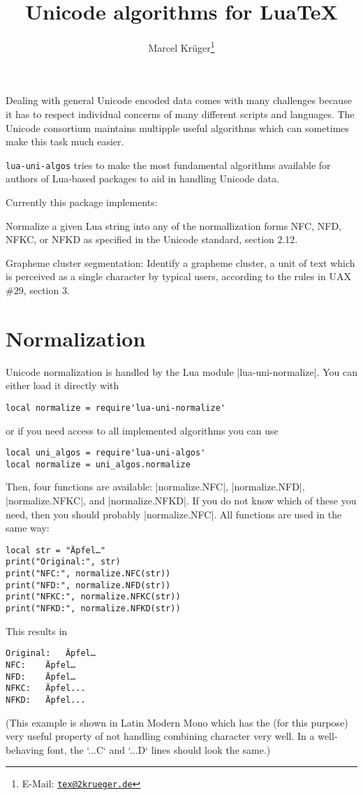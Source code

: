 \documentclass{article}
\title{Unicode algorithms for Lua\TeX}
\author{Marcel Krüger\thanks{E-Mail: \href{mailto:tex@2krueger.de}{\nolinkurl{tex@2krueger.de}}}}
\newcommand\pkg{\texttt}
\begin{document}
\maketitle
Dealing with general Unicode encoded data comes with many challenges because it has to respect individual concerns of many different scripts and languages. The Unicode consortium maintains multipple useful algorithms which can sometimes make this task much easier.

\pkg{lua-uni-algos} tries to make the most fundamental algorithms available for authors of Lua-based packages to aid in handling Unicode data.

Currently this package implements:
\begin{description}
  \item[Unicode normalization] Normalize a given Lua string into any of the normallization forms NFC, NFD, NFKC, or NFKD as specified in the Unicode standard, section 2.12.
  \item Grapheme cluster segmentation: Identify a grapheme cluster, a unit of text which is perceived as a single character by typical users, according to the rules in UAX \#29, section 3.
\end{description}
\section{Normalization}
Unicode normalization is handled by the Lua module |lua-uni-normalize|.
You can either load it directly with
\begin{verbatim}
local normalize = require'lua-uni-normalize'
\end{verbatim}
or if you need access to all implemented algorithms you can use
\begin{verbatim}
local uni_algos = require'lua-uni-algos'
local normalize = uni_algos.normalize
\end{verbatim}

Then, four functions are available: |normalize.NFC|, |normalize.NFD|, |normalize.NFKC|, and |normalize.NFKD|.
If you do not know which of these you need, then you should probably |normalize.NFC|. All functions are used in the same way:
\begin{verbatim}
local str = "Äpfel…"
print("Original:", str)
print("NFC:", normalize.NFC(str))
print("NFD:", normalize.NFD(str))
print("NFKC:", normalize.NFKC(str))
print("NFKD:", normalize.NFKD(str))
\end{verbatim}
This results in
\begin{verbatim}
Original:	Äpfel…
NFC:	Äpfel…
NFD:	Äpfel…
NFKC:	Äpfel...
NFKD:	Äpfel...
\end{verbatim}
(This example is shown in Latin Modern Mono which has the (for this purpose) very useful property of not handling combining character very well.
In a well-behaving font, the `...C` and `...D` lines should look the same.)
\end{document}
